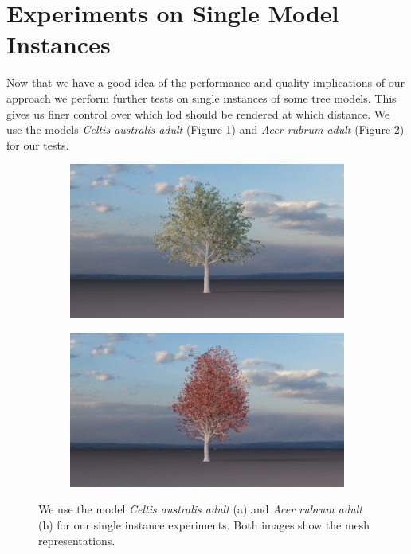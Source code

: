 \section{Experiments on Single Model Instances}
\label{sec:experiments_on_single_model_instances}
Now that we have a good idea of the performance and quality implications of our approach we perform further tests on single instances of some tree models.
This gives us finer control over which \ac{lod} should be rendered at which distance.
We use the models \textit{Celtis australis adult} (Figure \ref{fig:EU06a}) and \textit{Acer rubrum adult} (Figure \ref{fig:EA01a}) for our tests.
\begin{figure}[ht]
    \centering
    \begin{subfigure}[b]{0.49\linewidth}
        \centering
        \includegraphics[width=1\linewidth]{img/results/EU06a.png}
        \caption{}
        \label{fig:EU06a}
    \end{subfigure}
    \begin{subfigure}[b]{0.49\linewidth}
        \centering
        \includegraphics[width=1\linewidth]{img/results/EA01a.png}
        \caption{}
        \label{fig:EA01a}
    \end{subfigure}
	\caption[Models for single instance experiments]{We use the model \textit{Celtis australis adult} (a) and \textit{Acer rubrum adult} (b) for our single instance experiments. Both images show the mesh representations.}
	\label{fig:single_model_instances}
\end{figure}

